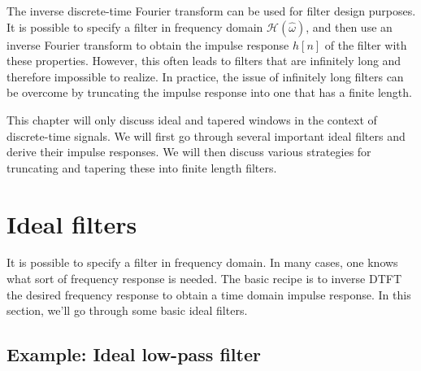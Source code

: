 The inverse discrete-time Fourier transform can be used for filter
design purposes. It is possible to specify a filter in frequency
domain $\mathcal{H}(\hat{\omega})$, and then use an inverse Fourier
transform to obtain the impulse response $h[n]$ of the filter with
these properties. However, this often leads to filters that are
infinitely long and therefore impossible to realize. In practice, the
issue of infinitely long filters can be overcome by truncating
the impulse response into one that has a finite length.

This chapter will only discuss ideal and tapered windows in the
context of discrete-time signals. We will first go through several
important ideal filters and derive their impulse responses. We will
then discuss various strategies for truncating and tapering these
into finite length filters.

\section{Ideal filters}

It is possible to specify a filter in frequency domain. In many cases,
one knows what sort of frequency response is needed. The basic recipe
is to inverse DTFT the desired frequency response to obtain a time
domain impulse response. In this section, we'll go through some basic
ideal filters.

\subsection{Example: Ideal low-pass filter}

